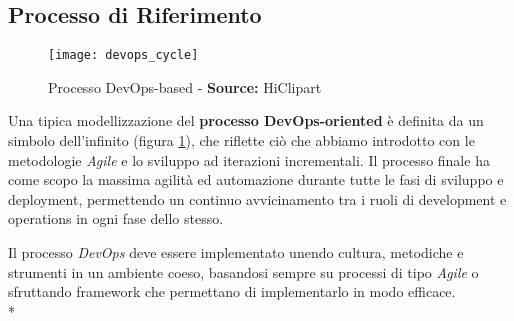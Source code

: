 \documentclass[../main.tex]{subfiles}
\begin{document}
        	\subsection{Processo di Riferimento}
        		
        		\begin{figure}[H]
        			\centering
        			\texttt{[image: devops\_cycle]}
        			\caption{Processo DevOps-based - \textbf{Source:} HiClipart}
        			\label{fig:devops_cycle}
        		\end{figure}
        
        		Una tipica modellizzazione del \textbf{processo DevOps-oriented}\cite{devops_flow} è definita da un simbolo dell'infinito (figura \ref{fig:devops_cycle}), che riflette ciò che abbiamo introdotto con le metodologie \emph{Agile} e lo sviluppo ad iterazioni incrementali. Il processo finale ha come scopo la massima agilità ed automazione durante tutte le fasi di sviluppo e deployment, permettendo un continuo avvicinamento tra i ruoli di development e operations in ogni fase dello stesso.
        		
        		Il processo \emph{DevOps} deve essere implementato unendo cultura, metodiche e strumenti in un ambiente coeso, basandosi sempre su processi di tipo \emph{Agile} o sfruttando framework che permettano di implementarlo in modo efficace.\\*
        		
\end{document}
